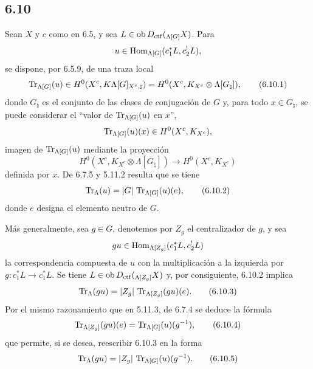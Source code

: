 \subsection*{6.10}
Sean $X$ y $c$ como en 6.5, y sea $L\in\operatorname{ob} D_{\mathrm{ctf}}({}_{\Lambda[G]}X)$. Para
\[
u\in\operatorname{Hom}_{\Lambda[G]}(c_1^*L,c_2^!L),
\]
se dispone, por 6.5.9, de una traza local
\begin{equation}
\operatorname{Tr}_{\Lambda[G]}(u)\in
H^0(X^c,K\Lambda[G]_{X^c,\natural})
=H^0(X^c,K_{X^c}\otimes\Lambda[G_{\natural}]),
\tag{6.10.1}
\end{equation}
donde $G_{\natural}$ es el conjunto de las clases de conjugación de $G$ y, para todo $x\in G_{\natural}$, se puede considerar el ``valor de $\operatorname{Tr}_{\Lambda[G]}(u)$ en $x$'',
\[
\operatorname{Tr}_{\Lambda[G]}(u)(x)\in H^0(X^c,K_{X^c}),
\]
imagen de $\operatorname{Tr}_{\Lambda[G]}(u)$ mediante la proyección
\[
H^0(X^c,K_{X^c}\otimes\Lambda[G_{\natural}])
\longrightarrow H^0(X^c,K_{X^c})
\]
definida por $x$. De 6.7.5 y 5.11.2 resulta que se tiene
\begin{equation}
\operatorname{Tr}_{\Lambda}(u)=|G|\,\operatorname{Tr}_{\Lambda[G]}(u)(e),
\tag{6.10.2}
\end{equation}
donde $e$ designa el elemento neutro de $G$.

Más generalmente, sea $g\in G$, denotemos por $Z_g$ el centralizador de $g$, y sea
\[
gu\in\operatorname{Hom}_{\Lambda[Z_g]}(c_1^*L,c_2^!L)
\]
la correspondencia compuesta de $u$ con la multiplicación a la izquierda por $g:c_1^*L\to c_1^*L$. Se tiene $L\in\operatorname{ob} D_{\mathrm{ctf}}({}_{\Lambda[Z_g]}X)$ y, por consiguiente, 6.10.2 implica
\begin{equation}
\operatorname{Tr}_{\Lambda}(gu)=|Z_g|\,\operatorname{Tr}_{\Lambda[Z_g]}(gu)(e).
\tag{6.10.3}
\end{equation}
Por el mismo razonamiento que en 5.11.3, de 6.7.4 se deduce la fórmula
\begin{equation}
\operatorname{Tr}_{\Lambda[Z_g]}(gu)(e)=\operatorname{Tr}_{\Lambda[G]}(u)(g^{-1}),
\tag{6.10.4}
\end{equation}
que permite, si se desea, reescribir 6.10.3 en la forma
\begin{equation}
\operatorname{Tr}_{\Lambda}(gu)=|Z_g|\,\operatorname{Tr}_{\Lambda[G]}(u)(g^{-1}).
\tag{6.10.5}
\end{equation}
